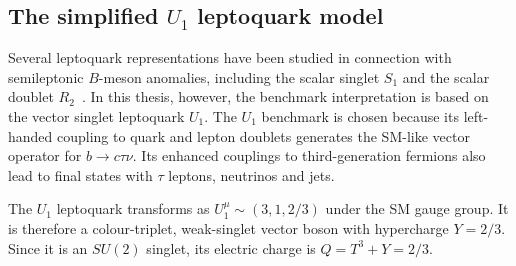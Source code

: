

\subsection{The simplified $U_{1}$ leptoquark model}
\label{subsec:u1_simplified_model}

Several leptoquark representations have been studied in connection with semileptonic $B$-meson anomalies, including the scalar singlet $S_{1}$ and the scalar doublet $R_{2}$~\cite{Sakaki2013LQ}. 
In this thesis, however, the benchmark interpretation is based on the vector singlet leptoquark $U_{1}$. 
The $U_{1}$ benchmark is chosen because its left-handed coupling to quark and lepton doublets generates the SM-like vector operator for $b\rightarrow c\tau\nu$. 
Its enhanced couplings to third-generation fermions also lead to final states with $\tau$ leptons, neutrinos and jets.

The $U_{1}$ leptoquark transforms as
$U_{1}^{\mu}\sim(3,1,2/3)$
under the SM gauge group.
It is therefore a colour-triplet, weak-singlet vector boson with hypercharge $Y=2/3$. 
Since it is an $SU(2)$ singlet, its electric charge is $Q=T^{3}+Y=2/3$.

